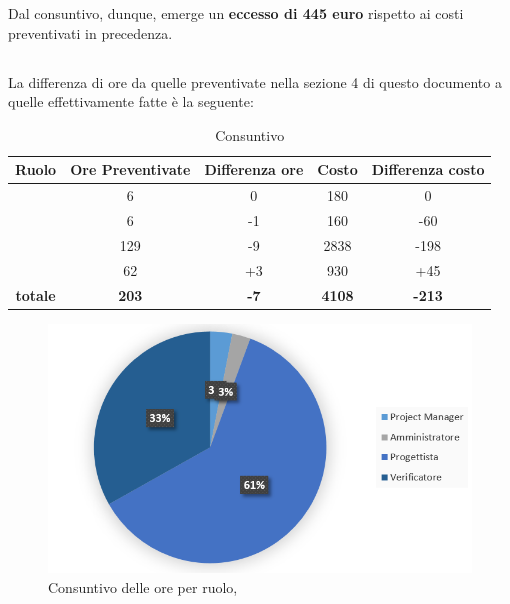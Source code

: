 Dal consuntivo, dunque, emerge un \textbf{eccesso di 445 euro} rispetto ai costi preventivati in precedenza.

\newpage

\subsection{\PA}
La differenza di ore da quelle preventivate nella sezione 4 di questo documento a quelle effettivamente fatte è la seguente:

\begin{table}[h]
	\begin{center}
		\begin{tabular}{|c|c|c|c|c|}
			\hline
			\textbf{Ruolo}	& \textbf{Ore Preventivate} & \textbf{Differenza ore} & \textbf{Costo} & \textbf{Differenza costo}\\
			\hline
			\Pm &	6  & 0 &	180 & 0	\\
			\hline
			\Am	&	6 &	-1 & 160 & -60\\
			\hline
			\Prog	&	129 & -9 & 2838 & -198\\
			\hline
			\Ver &	62 & +3 & 930 & +45\\
			\hline
			\textbf{totale}	&	\textbf{203} & \textbf{-7} & \textbf{4108} & \textbf{-213}\\
			\hline
		\end{tabular}
	\end{center}
	\caption{Consuntivo \PA}
\end{table}

\begin{figure}[H]
	\centering 
	\includegraphics[scale=1.25]{Immagini/Consuntivo/ConsuntivoPA.png}
	\caption{Consuntivo delle ore per ruolo, \PA}
\end{figure}

